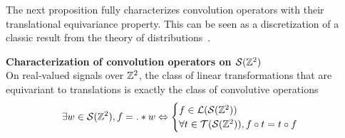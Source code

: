 The next proposition fully characterizes convolution operators with their translational equivariance property. This can be seen as a discretization of a classic result from the theory of distributions~\citep{schwartz1957theorie}.
{}
\begin{proposition}\textbf{Characterization of convolution operators on $\mathcal{S}(\mathbb{Z}^2)$}\\
On real-valued signals over $\mathbb{Z}^2$, the class of linear transformations that are equivariant to translations is exactly the class of convolutive operations \ie
\begin{gather*}
\exists w \in \mathcal{S}(\mathbb{Z}^2), f = . \ast w \Leftrightarrow
\begin{cases}
 f \in \mathcal{L}(\mathcal{S}(\mathbb{Z}^2))\\
 \forall t \in \mathcal{T}(\mathcal{S}(\mathbb{Z}^2)), f \circ t = t \circ f
\end{cases}
\end{gather*}
\label{prop:equi}
\end{proposition}

